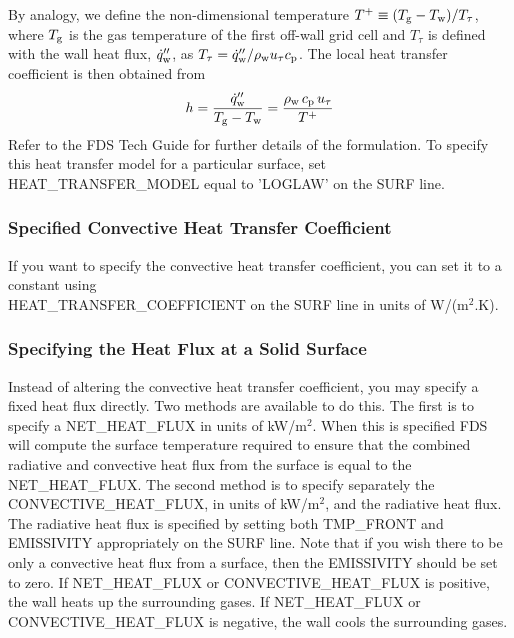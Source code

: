 \documentclass[11pt]{book}
\begin{document}
By analogy, we define the non-dimensional temperature $T^+ \equiv (T_{\rm g}-T_{\rm w})/T_\tau$, where $T_{\rm g}$ is the gas temperature of the first off-wall grid cell and $T_\tau$ is defined with the wall heat flux, $\dot{q}''_{\rm w}$, as $T_\tau = \dot{q}''_{\rm w}/\rho_{\rm w} u_\tau c_{\rm p}$. The local heat transfer coefficient is then obtained from
\begin{equation}
h = \frac{\dot{q}''_{\rm w}}{T_{\rm g}-T_{\rm w}} = \frac{\rho_{\rm w} \, c_{\rm p} \, u_\tau}{T^+}
\end{equation}
Refer to the FDS Tech Guide \cite{FDS_Tech_Guide} for further details of the formulation. To specify this heat transfer model for a particular
surface, set {\ct HEAT\_TRANSFER\_MODEL} equal to {\ct 'LOGLAW'} on the {\ct SURF} line.

\subsubsection{Specified Convective Heat Transfer Coefficient}

If you want to specify the convective heat transfer coefficient, you can set it to a constant using \\
{\ct HEAT\_TRANSFER\_COEFFICIENT} on the {\ct SURF} line in units of \si{W/(m$^2$.K)}.

\subsubsection{Specifying the Heat Flux at a Solid Surface}

Instead of altering the convective heat transfer coefficient, you may specify
a fixed heat flux directly.  Two methods are available to do this.  The first is to specify a
{\ct NET\_HEAT\_FLUX} in units of kW/m$^2$.  When this is specified FDS will compute the surface
temperature required to
ensure that the combined radiative and convective heat flux from the surface is equal to the
{\ct NET\_HEAT\_FLUX}.  The second method is to specify separately the {\ct CONVECTIVE\_HEAT\_FLUX},
in units of kW/m$^2$, and the radiative heat flux.  The radiative heat flux is specified  by setting both
{\ct TMP\_FRONT} and {\ct EMISSIVITY} appropriately on the {\ct SURF} line. Note that if you wish there to be only a convective heat flux from a
surface, then the {\ct EMISSIVITY} should be set to zero.  If {\ct NET\_HEAT\_FLUX} or
{\ct CONVECTIVE\_HEAT\_FLUX} is positive, the wall heats up the surrounding gases. If {\ct NET\_HEAT\_FLUX} or
{\ct CONVECTIVE\_HEAT\_FLUX} is negative, the wall cools the surrounding gases.
\end{document}
